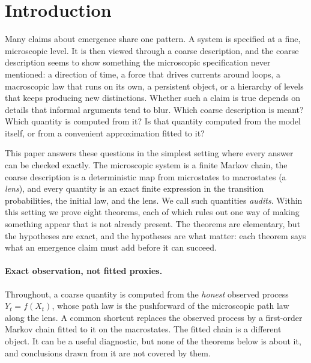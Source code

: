 \documentclass[11pt]{article}
\theoremstyle{definition}
\newcommand{\1}{\mathbf{1}}
\begin{document}
\section{Introduction}\label{sec:introduction}

Many claims about emergence share one pattern.
A system is specified at a fine, microscopic level.
It is then viewed through a coarse description, and the coarse description seems to show something the microscopic specification never mentioned: a direction of time, a force that drives currents around loops, a macroscopic law that runs on its own, a persistent object, or a hierarchy of levels that keeps producing new distinctions.
Whether such a claim is true depends on details that informal arguments tend to blur.
Which coarse description is meant?
Which quantity is computed from it?
Is that quantity computed from the model itself, or from a convenient approximation fitted to it?

This paper answers these questions in the simplest setting where every answer can be checked exactly.
The microscopic system is a finite Markov chain, the coarse description is a deterministic map from microstates to macrostates (a \emph{lens}), and every quantity is an exact finite expression in the transition probabilities, the initial law, and the lens.
We call such quantities \emph{audits}.
Within this setting we prove eight theorems, each of which rules out one way of making something appear that is not already present.
The theorems are elementary, but the hypotheses are exact, and the hypotheses are what matter: each theorem says what an emergence claim must add before it can succeed.

\paragraph{Exact observation, not fitted proxies.}
Throughout, a coarse quantity is computed from the \emph{honest} observed process $Y_t=f(X_t)$, whose path law is the pushforward of the microscopic path law along the lens.
A common shortcut replaces the observed process by a first-order Markov chain fitted to it on the macrostates.
The fitted chain is a different object.
It can be a useful diagnostic, but none of the theorems below is about it, and conclusions drawn from it are not covered by them.
\end{document}
